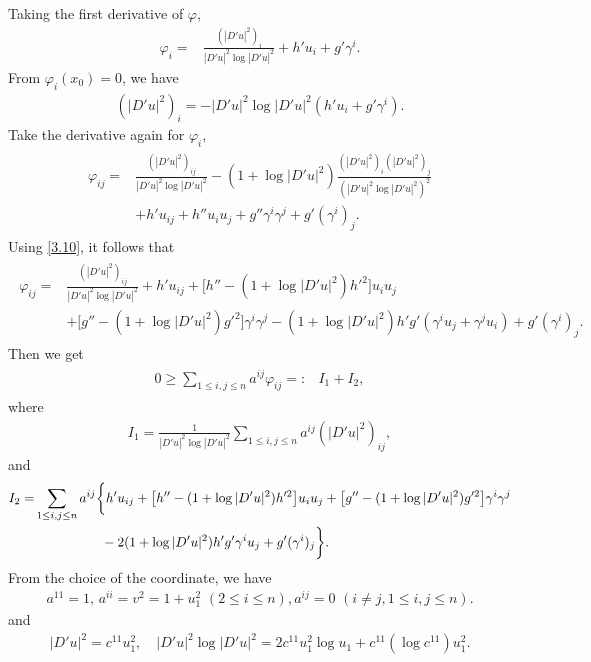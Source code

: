 \documentclass[11pt]{amsart}
\numberwithin{equation}{section}
\begin{document}
Taking the first  derivative of $\varphi$,
\begin{align}\label{3.9}
\varphi_i=&\frac{(|D'u|^2)_i}{|D'u|^2\log|D'u|^2}+h'u_i+g'\gamma^i.
\end{align}
From $\varphi_i(x_0)=0$,  we have
\begin{align}\label{3.10}
(|D'u|^2)_i=-|D'u|^2\log|D'u|^2(h'u_i+g'\gamma^i).
\end{align}
Take the derivative again for  $\varphi_i$,
\begin{align}\label{3.11}
\begin{split}
\varphi_{ij}
=&\frac{(|D'u|^2)_{ij}}{|D'u|^2\log|D'u|^2}-(1+\log|D'u|^2)\frac{(|D'u|^2)_i(|D'u|^2)_j}{(|D'u|^2\log|D'u|^2)^2}\\&
+h'u_{ij}
+h''u_iu_j+g''\gamma^i\gamma^j+g'(\gamma^i)_j.
\end{split}
\end{align}
Using \eqref{3.10}, it follows that
\begin{align}\label{3.12}
\begin{split}
\varphi_{ij}
=&\frac{(|D'u|^2)_{ij}}{|D'u|^2\log|D'u|^2}+h'u_{ij}+\big[h''-(1+\log|D'u|^2)h'^2\big]u_iu_j\\&
+\big[g''-(1+\log|D'u|^2)g'^2\big]\gamma^i\gamma^j
-(1+\log|D'u|^2)h'g'(\gamma^iu_j+\gamma^ju_i)+g'(\gamma^i)_j.
\end{split}
\end{align}
Then we get
\begin{align}\label{3.13}
\begin{split}
0\geq \sum_{1\leq i,j\leq n}a^{ij}\varphi_{ij}
=:&I_1+I_2,
\end{split}
\end{align}
where
\begin{align}
I_1=\frac{1}{|D'u|^2\log|D'u|^2}\sum_{1\leq i,j\leq n}a^{ij}(|D'u|^2)_{ij},\label{3.14}\end{align}
and
\begin{align}
I_2=&\sum_{1\leq i,j\leq n}a^{ij}\bigg\{h' u_{ij}+\big[h''-(1+\log|D'u|^2)h'^2\big]u_iu_j+\big[g''-(1+\log|D'u|^2)g'^2\big]\gamma^i\gamma^j\notag\\
&\qquad\qquad\quad-2(1+\log|D'u|^2)h'g'\gamma^iu_j+g'(\gamma^i)_j\bigg\}\label{3.15}.
\end{align}
From the choice of the coordinate, we have
\begin{align}\label{3.16a}
a^{11}=1,\, a^{ii}=v^2=1+u_1^2 \,\,(2\leq i\leq n ), a^{ij}=0\,\, (i\neq j,1\leq i,j\leq n).
\end{align}
and
\begin{align}\label{3.17a}
|D'u|^2=c^{11}u^2_1,\quad |D'u|^2\log|D'u|^2=2c^{11}u_1^2\log u_1+c^{11}(\log c^{11})u_1^2.
\end{align}
\end{document}
